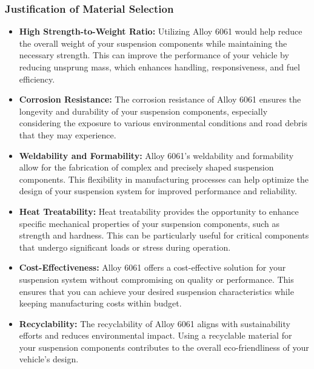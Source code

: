 \subsubsection{Justification of Material Selection}

\begin{itemize}
    \item \textbf{High Strength-to-Weight Ratio:} Utilizing Alloy 6061 would help reduce the overall weight of your suspension components while maintaining the necessary strength. This can improve the performance of your vehicle by reducing unsprung mass, which enhances handling, responsiveness, and fuel efficiency.
    
    \item \textbf{Corrosion Resistance:} The corrosion resistance of Alloy 6061 ensures the longevity and durability of your suspension components, especially considering the exposure to various environmental conditions and road debris that they may experience.
    
    \item \textbf{Weldability and Formability:} Alloy 6061's weldability and formability allow for the fabrication of complex and precisely shaped suspension components. This flexibility in manufacturing processes can help optimize the design of your suspension system for improved performance and reliability.
    
    \item \textbf{Heat Treatability:} Heat treatability provides the opportunity to enhance specific mechanical properties of your suspension components, such as strength and hardness. This can be particularly useful for critical components that undergo significant loads or stress during operation.
    
    \item \textbf{Cost-Effectiveness:} Alloy 6061 offers a cost-effective solution for your suspension system without compromising on quality or performance. This ensures that you can achieve your desired suspension characteristics while keeping manufacturing costs within budget.
    
    \item \textbf{Recyclability:} The recyclability of Alloy 6061 aligns with sustainability efforts and reduces environmental impact. Using a recyclable material for your suspension components contributes to the overall eco-friendliness of your vehicle's design.
\end{itemize}


